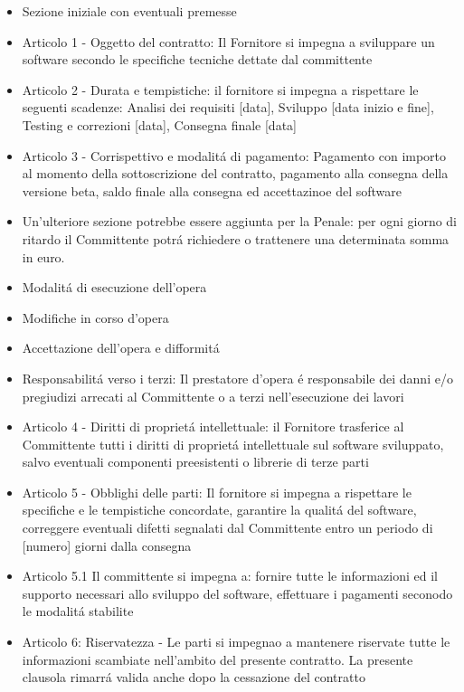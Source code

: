 \documentclass{article}
\begin{document}
\begin{itemize}
    \item Sezione iniziale con eventuali premesse
    \item Articolo 1 - Oggetto del contratto: Il Fornitore si impegna a sviluppare un software secondo le specifiche tecniche dettate dal committente
    \item Articolo 2 - Durata e tempistiche: il fornitore si impegna a rispettare le seguenti scadenze: Analisi dei requisiti [data], Sviluppo [data inizio e fine], Testing e correzioni [data], Consegna finale [data]
    \item Articolo 3 - Corrispettivo e modalit\'a di pagamento: Pagamento con importo al momento della sottoscrizione del contratto, pagamento alla consegna della versione beta, saldo finale alla consegna ed accettazinoe del software
    \item Un'ulteriore sezione potrebbe essere aggiunta per la Penale: per ogni giorno di ritardo il Committente potr\'a richiedere o trattenere una determinata somma in euro.
    \item Modalit\'a di esecuzione dell'opera
    \item Modifiche in corso d'opera
    \item Accettazione dell'opera e difformit\'a
    \item Responsabilit\'a verso i terzi: Il prestatore d'opera \'e responsabile dei danni e/o pregiudizi arrecati al Committente o a terzi nell'esecuzione dei lavori
    \item Articolo 4 - Diritti di propriet\'a intellettuale: il Fornitore trasferice al Committente tutti i diritti di propriet\'a intellettuale sul software sviluppato, salvo eventuali componenti preesistenti o librerie di terze parti
    \item Articolo 5 - Obblighi delle parti: Il fornitore si impegna a rispettare le specifiche e le tempistiche concordate, garantire la qualit\'a del software, correggere eventuali difetti segnalati dal Committente entro un periodo di [numero] giorni dalla consegna
    \item Articolo 5.1 Il committente si impegna a: fornire tutte le informazioni ed il supporto necessari allo sviluppo del software, effettuare i pagamenti seconodo le modalit\'a stabilite
    \item Articolo 6: Riservatezza - Le parti si impegnao a mantenere riservate tutte le informazioni scambiate nell'ambito del presente contratto. La presente clausola rimarr\'a valida anche dopo la cessazione del contratto

\end{itemize}
\end{document}
